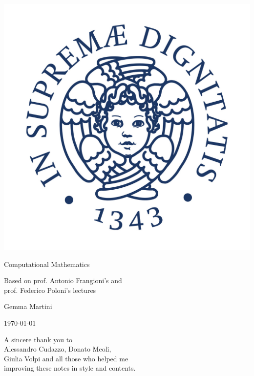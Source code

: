 \documentclass[preview,12pt]{article}
\begin{document}
\begin{titlepage}
\begin{center}
\vspace{3cm}

\Large

\vspace{2cm}

\includegraphics[scale=0.3]{pics/cherubino.jpg}

\vspace{2.5cm}

{\Huge \sc Computational Mathematics}

\vspace{2cm}
Based on prof. Antonio Frangioni's and\\
  prof. Federico Poloni's lectures

\vspace{2cm}
Gemma Martini
\vfill

\today

\end{center}
\end{titlepage}


\phantom{pippo}
\vspace{5cm}
\begin{flushleft}
A sincere thank you to\\
Alessandro Cudazzo, Donato Meoli,\\
Giulia Volpi and all those who helped me\\
improving these notes in style and contents.\\
\end{flushleft}
\newpage
\end{document}

